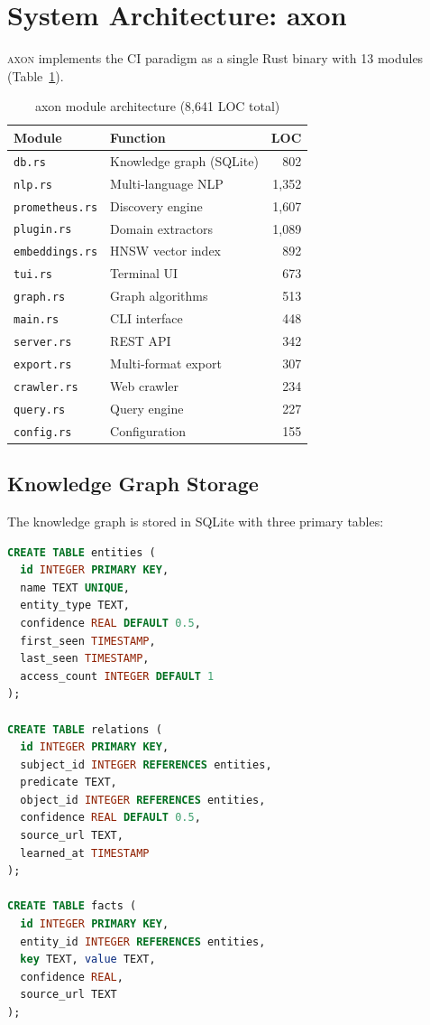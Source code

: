 \documentclass[11pt,twocolumn]{article}
\begin{document}
\section{System Architecture: axon}
\label{sec:axon}

\textsc{axon} implements the CI paradigm as a single Rust binary with 13 modules (Table~\ref{tab:modules}).

\begin{table}[h]
\centering
\caption{axon module architecture (8{,}641 LOC total)}
\label{tab:modules}
\small
\begin{tabular}{@{}llr@{}}
\toprule
\textbf{Module} & \textbf{Function} & \textbf{LOC} \\
\midrule
\texttt{db.rs} & Knowledge graph (SQLite) & 802 \\
\texttt{nlp.rs} & Multi-language NLP & 1{,}352 \\
\texttt{prometheus.rs} & Discovery engine & 1{,}607 \\
\texttt{plugin.rs} & Domain extractors & 1{,}089 \\
\texttt{embeddings.rs} & HNSW vector index & 892 \\
\texttt{tui.rs} & Terminal UI & 673 \\
\texttt{graph.rs} & Graph algorithms & 513 \\
\texttt{main.rs} & CLI interface & 448 \\
\texttt{server.rs} & REST API & 342 \\
\texttt{export.rs} & Multi-format export & 307 \\
\texttt{crawler.rs} & Web crawler & 234 \\
\texttt{query.rs} & Query engine & 227 \\
\texttt{config.rs} & Configuration & 155 \\
\bottomrule
\end{tabular}
\end{table}

\subsection{Knowledge Graph Storage}

The knowledge graph is stored in SQLite with three primary tables:

\begin{lstlisting}[language=SQL]
CREATE TABLE entities (
  id INTEGER PRIMARY KEY,
  name TEXT UNIQUE,
  entity_type TEXT,
  confidence REAL DEFAULT 0.5,
  first_seen TIMESTAMP,
  last_seen TIMESTAMP,
  access_count INTEGER DEFAULT 1
);

CREATE TABLE relations (
  id INTEGER PRIMARY KEY,
  subject_id INTEGER REFERENCES entities,
  predicate TEXT,
  object_id INTEGER REFERENCES entities,
  confidence REAL DEFAULT 0.5,
  source_url TEXT,
  learned_at TIMESTAMP
);

CREATE TABLE facts (
  id INTEGER PRIMARY KEY,
  entity_id INTEGER REFERENCES entities,
  key TEXT, value TEXT,
  confidence REAL,
  source_url TEXT
);
\end{lstlisting}
\end{document}
